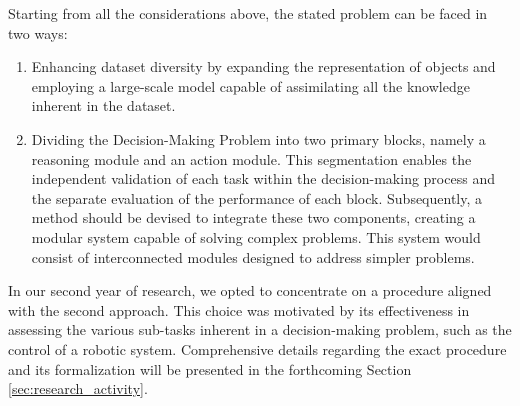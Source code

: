 Starting from all the considerations above, the stated problem can be faced in two ways:
\begin{enumerate}
    \item Enhancing dataset diversity by expanding the representation of objects and employing a large-scale model capable of assimilating all the knowledge inherent in the dataset.
    \item Dividing the Decision-Making Problem into two primary blocks, namely a reasoning module and an action module. This segmentation enables the independent validation of each task within the decision-making process and the separate evaluation of the performance of each block. Subsequently, a method should be devised to integrate these two components, creating a modular system capable of solving complex problems. This system would consist of interconnected modules designed to address simpler problems.
\end{enumerate}
In our second year of research, we opted to concentrate on a procedure aligned with the second approach. This choice was motivated by its effectiveness in assessing the various sub-tasks inherent in a decision-making problem, such as the control of a robotic system. Comprehensive details regarding the exact procedure and its formalization will be presented in the forthcoming Section \ref{sec:research_activity}.
